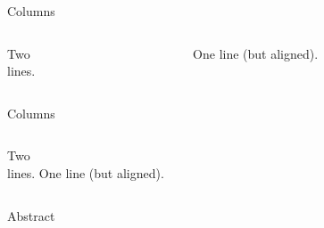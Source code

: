 \begin{frame}{Columns}
  \begin{columns}[t]
    \begin{column}{5cm}
    Two\\lines.
    \end{column}
    \begin{column}{5cm}
    One line (but aligned).
    \end{column}
  \end{columns}
\end{frame}


\begin{frame}{Columns}
  \begin{columns}
    \column[t]{5cm}
      Two\\lines.
    \column[t]{5cm}
      One line (but aligned).
  \end{columns}
\end{frame}


\begin{frame}{Abstract}
  \begin{abstract}
    This is the abstract
  \end{abstract}
\end{frame}


